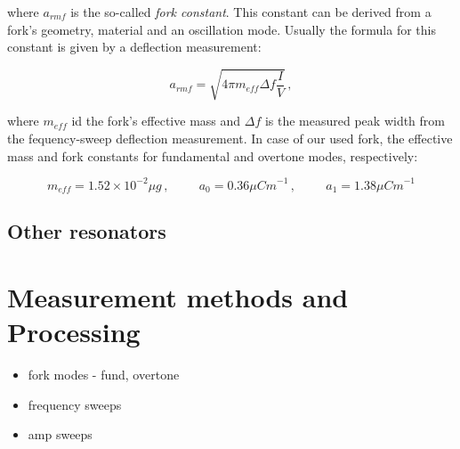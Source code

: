 where $a_{rmf}$ is the so-called \textit{fork constant}. This constant can be derived from a fork's geometry, material and an oscillation mode. Usually the formula for this constant is given by a deflection measurement:

\begin{equation}
a_{rmf} = \sqrt{4\pi m_{eff} \Delta f \frac{I}{V}}\,,
\end{equation}

where $m_{eff}$ id the fork's effective mass and $\Delta f$ is the measured peak width from the fequency-sweep deflection measurement. In case of our used fork, the effective mass and fork constants for fundamental and overtone modes, respectively:

\begin{equation}
m_{eff} = 1.52 \times 10^{-2} \mu\unit{g}\,,
\hspace{1cm}
a_0 = 0.36 \mu\unit{Cm}^{-1}\,,
\hspace{1cm}
a_1 = 1.38 \mu\unit{Cm}^{-1}
\end{equation}

\subsection*{Other resonators}
\todo

%
%
%
%


\section{Measurement methods and Processing}
\begin{itemize}
	\item fork modes - fund, overtone
	\item frequency sweeps
	\item amp sweeps
\end{itemize}

